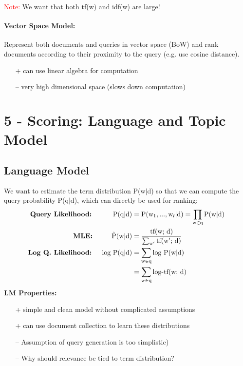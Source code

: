 \documentclass[a4paper,11pt]{article}
\newcommand{\msection}[1]{\section{#1}\vspace{-0.5mm}}
\newcommand{\tf}{\text{tf(w; d)}} %
\begin{document}
\begin{multicols}{2}
\textcolor{red}{Note:} We want that both tf(w) and idf(w) are large!

\paragraph{Vector Space Model:} Represent both documents and queries in vector space (BoW) and rank documents according to their proximity to the query (e.g. use cosine distance).
\begin{itemize}[leftmargin=0.3cm]
  \item [+] can use linear algebra for computation
  \item [--] very high dimensional space (slows down computation)
\end{itemize}

\msection{5 - Scoring: Language and Topic Model}
\subsection{Language Model}
We want to estimate the term distribution P(w$|$d) so that we can compute the query probability P(q$|$d), which can directly be used for ranking:
\begin{align*}
  \textbf{Query Likelihood: }& &\text P(\text q | \text d) &= \text P(\text w_1, ... , \text w_l | \text d) = \prod_{\text w \in \text q} \text P(\text w | \text d)\\
  \textbf{MLE: }&  &\hat{\text{P}}(\text w | \text d) &= \frac{\tf}{\sum_{\text w'} \text{tf(w$'$; d)}}\\
  \textbf{Log Q. Likelihood: }& &\text{log P}(\text q | \text d) &= \sum_{\text w \in \text q} \text{log P}(\text w | \text d) \\ 
  &&&= \sum_{\text w \in \text q} \text{log-tf(w; d)}
\end{align*}
\textbf{LM Properties:}
\begin{itemize}[leftmargin=0.3cm]
  \item [+] simple and clean model without complicated assumptions
  \item [+] can use document collection to learn these distributions
  \item [--] Assumption of query generation is too simplistic)
  \item [--] Why should relevance be tied to term distribution?
\end{itemize}

\end{multicols}
\end{document}
